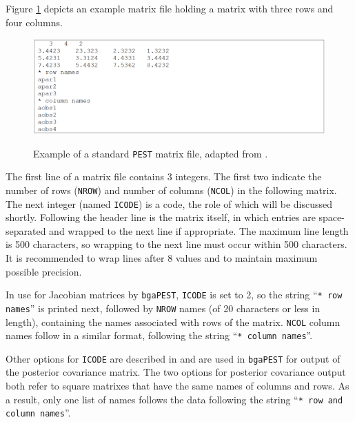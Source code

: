 \documentclass[11pt,oneside,onecolumn]{usgsreport}
\begin{document}
\begin{appendix}
Figure \ref{fig:matrix} depicts an example matrix file holding a
matrix with three rows and four columns.

\begin{figure}[H]
\begin{center}\label{fig:matrix}\includegraphics[scale=0.25]{figures/standard_PEST_matrix}\end{center}

\caption{Example of a standard \texttt{PEST} matrix file, adapted from \citet{PESTAdd}.}
\end{figure}


The first line of a matrix file contains 3 integers. The first two
indicate the number of rows (\texttt{NROW}) and number of columns
(\texttt{NCOL}) in the following matrix. The next integer (named \texttt{ICODE})
is a code, the role of which will be discussed shortly. Following
the header line is the matrix itself, in which entries are space-separated
and wrapped to the next line if appropriate. The maximum line length
is 500 characters, so wrapping to the next line must occur within
500 characters. It is recommended to wrap lines after 8 values and
to maintain maximum possible precision.

In use for Jacobian matrices by \texttt{bgaPEST}, \texttt{ICODE} is
set to 2, so the string \textquotedblleft{}\texttt{{*} row names}\textquotedblright{}
is printed next, followed by \texttt{NROW} names (of 20 characters
or less in length), containing the names associated with rows of the
matrix. \texttt{NCOL} column names follow in a similar format, following
the string \textquotedblleft{}\texttt{{*} column names}\textquotedblright{}. 

Other options for \texttt{ICODE} are described in \citet{PESTAdd}
and are used in \texttt{bgaPEST} for output of the posterior covariance
matrix. The two options for posterior covariance output both refer
to square matrixes that have the same names of columns and rows. As
a result, only one list of names follows the data following the string
\textquotedblleft{}\texttt{{*} row and column names}\textquotedblright{}. 


\end{appendix}
\end{document}
